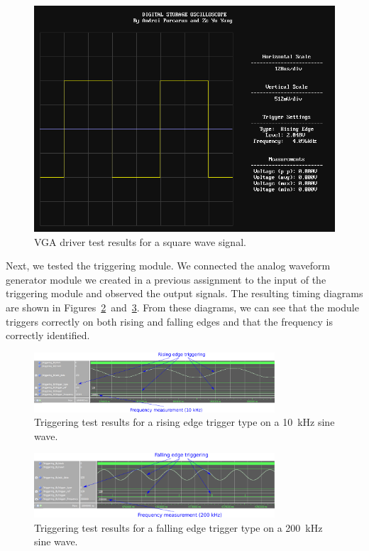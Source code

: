 \documentclass[journal]{IEEEtran}
\begin{document}
\begin{figure}[!htb]
  \centering
  \includegraphics[width=\columnwidth]{test-results/vga_test_signal2.png}
  \caption{VGA driver test results for a square wave signal.}
  \label{fig:vga_test_2}
\end{figure}

Next, we tested the triggering module. We connected the analog waveform generator module we created in a previous assignment to the input of the triggering module and observed the output signals. The resulting timing diagrams are shown in Figures~\ref{fig:trigger_test_1}~and~\ref{fig:trigger_test_2}. From these diagrams, we can see that the module triggers correctly on both rising and falling edges and that the frequency is correctly identified.

\begin{figure}[!htb]
  \centering
  \includegraphics[width=0.8\textwidth]{test-results/trigger_test_rising_10kHz.png}
  \caption{Triggering test results for a rising edge trigger type on a 10~kHz sine wave.}
  \label{fig:trigger_test_1}
\end{figure}

\begin{figure}[!htb]
  \centering
  \includegraphics[width=0.8\textwidth]{test-results/trigger_test_falling_200kHz.png}
  \caption{Triggering test results for a falling edge trigger type on a 200~kHz sine wave.}
  \label{fig:trigger_test_2}
\end{figure}
\end{document}
